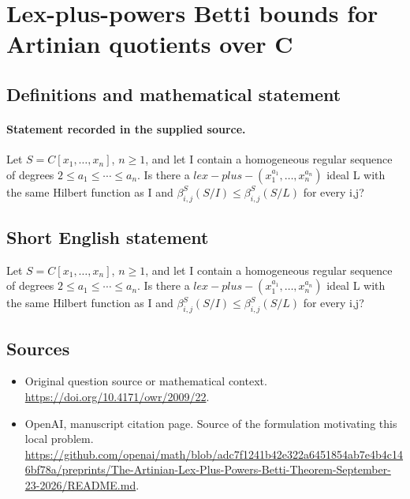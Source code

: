 \documentclass[11pt]{article}
\begin{document}
\section*{Lex-plus-powers Betti bounds for Artinian quotients over C}\label{statement}
\subsection{Definitions and mathematical statement}
\paragraph{Statement recorded in the supplied source.}
Let $S=C[x_{1},\dots ,x_{n}]$, $n\geq 1$, and let I contain a homogeneous regular sequence of degrees $2\leq a_{1}\leq \cdots \leq a_{n}$. Is there a $lex-plus-(x_{1}^{a_{1}},\dots ,x_{n}^{a_{n}})$ ideal L with the same Hilbert function as I and $\beta ^S_{i,j}(S/I)\leq \beta ^S_{i,j}(S/L)$ for every i,j?
\subsection{Short English statement}
Let $S=C[x_{1},\dots ,x_{n}]$, $n\geq 1$, and let I contain a homogeneous regular sequence of degrees $2\leq a_{1}\leq \cdots \leq a_{n}$. Is there a $lex-plus-(x_{1}^{a_{1}},\dots ,x_{n}^{a_{n}})$ ideal L with the same Hilbert function as I and $\beta ^S_{i,j}(S/I)\leq \beta ^S_{i,j}(S/L)$ for every i,j?
\subsection{Sources}
\begin{itemize}
\item[S1] Original question source or mathematical context.
\url{https://doi.org/10.4171/owr/2009/22}.
\item[S2] OpenAI, manuscript citation page. Source of the formulation motivating this local problem.
\url{https://github.com/openai/math/blob/adc7f1241b42e322a6451854ab7e4b4c146bf78a/preprints/The-Artinian-Lex-Plus-Powers-Betti-Theorem-September-23-2026/README.md}.
\end{itemize}
\end{document}

